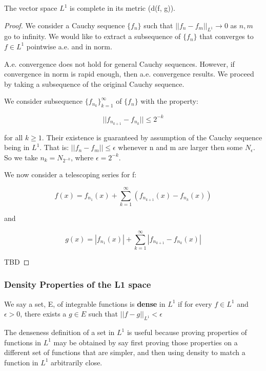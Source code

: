 \documentclass[class=article, crop=false]{standalone}
\begin{document}
			\begin{theorem}
			\label{thm:riesz-fischer-completeness}
				The vector space $L^1$ is complete in its metric (d(f, g)).
			\end{theorem}
			\begin{proof}
				We consider a Cauchy sequence $\{f_n\}$ such that $||f_n - f_m||_{L^1} \rightarrow 0$ as $n, m$ go to infinity. We would like to extract a subsequence of $\{f_n\}$ that converges to $f \in L^1$ pointwise a.e. and in norm.

				A.e. convergence does not hold for general Cauchy sequences. However, if convergence in norm is rapid enough, then a.e. convergence results. We proceed by taking a subsequence of the original Cauchy sequence.

				We consider subsequence $\{f_{n_k}\}_{k=1}^\infty$ of $\{f_n\}$ with the property:

					$$||f_{n_{k+1}} - f_{n_k}|| \le 2^{-k}$$

				for all $k \ge 1$. Their existence is guaranteed by assumption of the Cauchy sequence being in $L^1$. That is: $||f_n - f_m|| \le \epsilon$ whenever n and m are larger then some $N_\epsilon$.  So we take $n_k = N_{2^{-k}}$, where $\epsilon = 2^{-k}$. 

				We now consider a telescoping series for f:

					$$f(x) = f_{n_1}(x) + \sum_{k=1}^\infty (f_{n_{k+1}}(x) - f_{n_k}(x))$$

				and 

					$$g(x) = |f_{n_1}(x)| + \sum_{k=1}^\infty |f_{n_{k+1}} - f_{n_k}(x)|$$

				TBD

			\end{proof}
		\subsubsection{Density Properties of the L1 space}

			\begin{definition}
				We say a set, E, of integrable functions is \textbf{dense} in $L^1$ if for every $f \in L^1$ and $\epsilon > 0$, there exists a $g \in E$ such that $||f - g||_{L^1} < \epsilon$
			\end{definition}

			The denseness definition of a set in $L^1$ is useful because proving properties of functions in $L^1$ may be obtained by say first proving those properties on a different set of functions that are simpler, and then using density to match a function in $L^1$ arbitrarily close.
\end{document}
